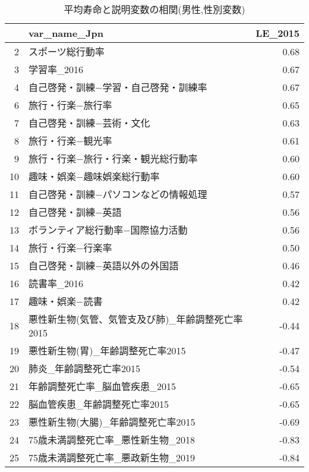 \begin{table}[H]
\centering
\caption{平均寿命と説明変数の相関(男性,性別変数)}
\label{LE_d_m_corr.tex}
\begingroup\tiny

\begin{adjustbox}{width=.5\textwidth}
\begin{tabular}{rlr}
  \hline
 & var\_name\_Jpn & LE\_2015 \\
  \hline
  2 & スポーツ総行動率 & 0.68 \\
  3 & 学習率\_2016 & 0.67 \\
  4 & 自己啓発・訓練−学習・自己啓発・訓練率 & 0.67 \\
  6 & 旅行・行楽−旅行率 & 0.65 \\
  7 & 自己啓発・訓練−芸術・文化 & 0.63 \\
  8 & 旅行・行楽−観光率 & 0.61 \\
  9 & 旅行・行楽−旅行・行楽・観光総行動率 & 0.60 \\
  10 & 趣味・娯楽−趣味娯楽総行動率 & 0.60 \\
  11 & 自己啓発・訓練−パソコンなどの情報処理 & 0.57 \\
  12 & 自己啓発・訓練−英語 & 0.56 \\
  13 & ボランティア総行動率−国際協力活動 & 0.56 \\
  14 & 旅行・行楽−行楽率 & 0.50 \\
  15 & 自己啓発・訓練−英語以外の外国語 & 0.46 \\
  16 & 読書率\_2016 & 0.42 \\
  17 & 趣味・娯楽−読書 & 0.42 \\
  18 & 悪性新生物(気管、気管支及び肺)\_年齢調整死亡率2015 & -0.44 \\
  19 & 悪性新生物(胃)\_年齢調整死亡率2015 & -0.47 \\
  20 & 肺炎\_年齢調整死亡率2015 & -0.54 \\
  21 & 年齢調整死亡率\_脳血管疾患\_2015 & -0.65 \\
  22 & 脳血管疾患\_年齢調整死亡率2015 & -0.65 \\
  23 & 悪性新生物(大腸)\_年齢調整死亡率2015 & -0.69 \\
  24 & 75歳未満調整死亡率\_悪性新生物\_2018 & -0.83 \\
  25 & 75歳未満調整死亡率\_悪政新生物\_2019 & -0.84 \\
   \hline
\end{tabular}
\end{adjustbox}

\endgroup
\end{table}
